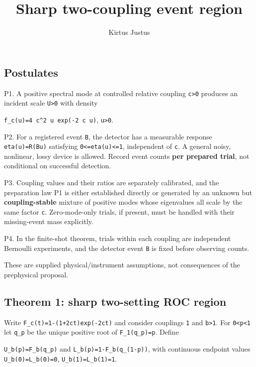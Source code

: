 \documentclass[
  10pt,
  a4paper,
]{article}
\title{Sharp two-coupling event region}
\author{Kirtus Justus}
\date{}
\begin{document}
\maketitle

\subsection{Postulates}\label{postulates}

P1. A positive spectral mode at controlled relative coupling \texttt{c\textgreater{}0} produces an incident scale \texttt{U\textgreater{}0} with density

\texttt{f\_c(u)=4\ c\^{}2\ u\ exp(-2\ c\ u)}, \texttt{u\textgreater{}0}.

P2. For a registered event \texttt{B}, the detector has a measurable response \texttt{eta(u)=R(B\textbar{}u)} satisfying \texttt{0\textless{}=eta(u)\textless{}=1}, independent of \texttt{c}. A general noisy, nonlinear, lossy device is allowed. Record event counts \textbf{per prepared trial}, not conditional on successful detection.

P3. Coupling values and their ratios are separately calibrated, and the preparation law P1 is either established directly or generated by an unknown but \textbf{coupling-stable} mixture of positive modes whose eigenvalues all scale by the same factor \texttt{c}. Zero-mode-only trials, if present, must be handled with their missing-event mass explicitly.

P4. In the finite-shot theorem, trials within each coupling are independent Bernoulli experiments, and the detector event \texttt{B} is fixed before observing counts.

These are supplied physical/instrument assumptions, not consequences of the prephysical proposal.

\subsection{Theorem 1: sharp two-setting ROC region}\label{theorem-1-sharp-two-setting-roc-region}

Write \texttt{F\_c(t)=1-(1+2ct)exp(-2ct)} and consider couplings \texttt{1} and \texttt{b\textgreater{}1}. For \texttt{0\textless{}p\textless{}1} let \texttt{q\_p} be the unique positive root of \texttt{F\_1(q\_p)=p}. Define

\texttt{U\_b(p)=F\_b(q\_p)} and \texttt{L\_b(p)=1-F\_b(q\_(1-p))}, with continuous endpoint values \texttt{U\_b(0)=L\_b(0)=0}, \texttt{U\_b(1)=L\_b(1)=1}.
\end{document}
